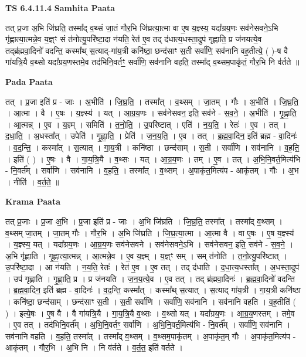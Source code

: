 \documentclass[17pt]{extarticle}
\begin{document}
\textbf{TS 6.4.11.4 } \newline
\textbf{Samhita Paata} \newline

तत् प्र॒जा अ॒भि जि॑घ्रति॒ तस्मा᳚द् व॒थ्सं जा॒तं गौर॒भि जि॑घ्रत्या॒त्मा वा ए॒ष य॒ज्ञ्स्य॒ यदा᳚ग्रय॒णः सव॑नेसवने॒ऽभि गृ॑ह्णात्या॒त्मन्ने॒व य॒ज्ञ्ꣳ सं त॑नोत्यु॒परि॑ष्टा॒दा न॑यति॒ रेत॑ ए॒व तद् द॑धात्य॒धस्ता॒दुप॑ गृह्णाति॒ प्र ज॑नयत्ये॒व तद्ब्र॑ह्मवा॒दिनो॑ वदन्ति॒ कस्मा᳚थ् स॒त्याद्-गा॑य॒त्री कनि॑ष्ठा॒ छन्द॑साꣳ स॒ती सर्वा॑णि॒ सव॑नानि वह॒तीत्ये॒ ( )-ष वै गा॑यत्रि॒यै व॒थ्सो यदा᳚ग्रय॒णस्तमे॒व तद॑भिनि॒वर्तꣳ॒॒ सर्वा॑णि॒ सव॑नानि वहति॒ तस्मा᳚द् व॒थ्सम॒पाकृ॑तं॒ गौर॒भि नि व॑र्तते ॥ \newline

\textbf{Pada Paata} \newline

तत् । प्र॒जा इति॑ प्र - जाः । अ॒भीति॑ । जि॒घ्र॒ति॒ । तस्मा᳚त् । व॒थ्सम् । जा॒तम् । गौः । अ॒भीति॑ । जि॒घ्र॒ति॒ । आ॒त्मा । वै । ए॒षः । य॒ज्ञ्स्य॑ । यत् । आ॒ग्र॒य॒णः । सव॑नेसवन॒ इति॒ सव॑ने - स॒व॒ने॒ । अ॒भीति॑ । गृ॒ह्णा॒ति॒ । आ॒त्मन्न् । ए॒व । य॒ज्ञ्म् । समिति॑ । त॒नो॒ति॒ । उ॒परि॑ष्टात् । एति॑ । न॒य॒ति॒ । रेतः॑ । ए॒व । तत् । द॒धा॒ति॒ । अ॒धस्ता᳚त् । उपेति॑ । गृ॒ह्णा॒ति॒ । प्रेति॑ । ज॒न॒य॒ति॒ । ए॒व । तत् । ब्र॒ह्म॒वा॒दिन॒ इति॑ ब्रह्म - वा॒दिनः॑ । व॒द॒न्ति॒ । कस्मा᳚त् । स॒त्यात् । गा॒य॒त्री । कनि॑ष्ठा । छन्द॑साम् । स॒ती । सर्वा॑णि । सव॑नानि । व॒ह॒ति॒ । इति॑ ( ) । ए॒षः । वै । गा॒य॒त्रि॒यै । व॒थ्सः । यत् । आ॒ग्र॒य॒णः । तम् । ए॒व । तत् । अ॒भि॒नि॒वर्त॒मित्य॑भि - नि॒वर्त᳚म् । सर्वा॑णि । सव॑नानि । व॒ह॒ति॒ । तस्मा᳚त् । व॒थ्सम् । अ॒पाकृ॑त॒मित्य॑प - आकृ॑तम् । गौः । अ॒भ । नीति॑ । व॒र्त॒ते॒ ॥  \newline


\textbf{Krama Paata} \newline

तत् प्र॒जाः । प्र॒जा अ॒भि । प्र॒जा इति॑ प्र - जाः । अ॒भि जि॑घ्रति । जि॒घ्र॒ति॒ तस्मा᳚त् । तस्मा᳚द् व॒थ्सम् । व॒थ्सम् जा॒तम् । जा॒तम् गौः । गौर॒भि । अ॒भि जि॑घ्रति । जि॒घ्र॒त्या॒त्मा । आ॒त्मा वै । वा ए॒षः । ए॒ष य॒ज्ञ्स्य॑ । य॒ज्ञ्स्य॒ यत् । यदा᳚ग्रय॒णः । आ॒ग्र॒य॒णः सव॑नेसवने । सव॑नेसवने॒ऽभि । सव॑नेसवन॒ इति॒ सव॑ने - स॒व॒ने॒ । अ॒भि गृ॑ह्णाति । गृ॒ह्णा॒त्या॒त्मन्न् । आ॒त्मन्ने॒व । ए॒व य॒ज्ञ्म् । य॒ज्ञ्ꣳ सम् । सम् त॑नोति । त॒नो॒त्यु॒परि॑ष्टात् । उ॒परि॑ष्टा॒दा । आ न॑यति । न॒य॒ति॒ रेतः॑ । रेत॑ ए॒व । ए॒व तत् । तद् द॑धाति । द॒धा॒त्य॒धस्ता᳚त् । अ॒धस्ता॒दुप॑ । उप॑ गृह्णाति । गृ॒ह्णा॒ति॒ प्र । प्र ज॑नयति । ज॒न॒य॒त्ये॒व । ए॒व तत् । तद् ब्र॑ह्मवा॒दिनः॑ । ब्र॒ह्म॒वा॒दिनो॑ वदन्ति । ब्र॒ह्म॒वा॒दिन॒ इति॑ ब्रह्म - वा॒दिनः॑ । व॒द॒न्ति॒ कस्मा᳚त् । कस्मा᳚थ् स॒त्यात् । स॒त्याद् गा॑य॒त्री । गा॒य॒त्री कनि॑ष्ठा । कनि॑ष्ठा॒ छन्द॑साम् । छन्द॑साꣳ स॒ती । स॒ती सर्वा॑णि । सर्वा॑णि॒ सव॑नानि । सव॑नानि वहति । व॒ह॒तीति॑ ( ) । इत्ये॒षः । ए॒ष वै । वै गा॑यत्रि॒यै । गा॒य॒त्रि॒यै व॒थ्सः । व॒थ्सो यत् । यदा᳚ग्रय॒णः । आ॒ग्र॒य॒णस्तम् । तमे॒व । ए॒व तत् । तद॑भिनि॒वर्त᳚म् । अ॒भि॒नि॒वर्तꣳ॒॒ सर्वा॑णि । अ॒भि॒नि॒वर्त॒मित्य॑भि - नि॒वर्त᳚म् । सर्वा॑णि॒ सव॑नानि । सव॑नानि वहति । व॒ह॒ति॒ तस्मा᳚त् । तस्मा᳚द् व॒थ्सम् । व॒थ्सम॒पाकृ॑तम् । अ॒पाकृ॑त॒म् गौः । अ॒पाकृ॑त॒मित्य॑प - आकृ॑तम् । गौर॒भि । अ॒भि नि । नि व॑र्तते । व॒र्त॒त॒ इति॑ वर्तते । \newline
\end{document}
